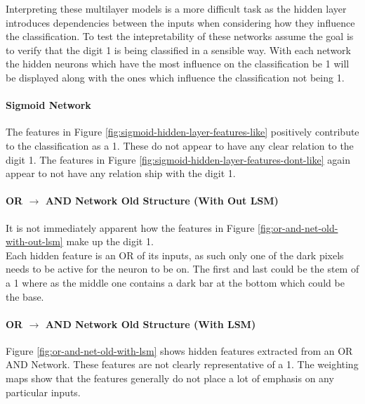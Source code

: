 \begin{minipage}[t]{0.45\textwidth}
	\vspace{0px}
	Interpreting these multilayer models is a more difficult task as the hidden layer introduces dependencies between the inputs when considering how they influence the classification. To test the intepretability of these networks assume the goal is to verify that the digit 1 is being classified in a sensible way. With each network the hidden neurons which have the most influence on the classification be 1 will be displayed along with the ones which influence the classification not being 1.	

	\paragraph{Sigmoid Network}
	The features in Figure \ref{fig:sigmoid-hidden-layer-features-like} positively contribute to the classification as a 1. These do not appear to have any clear relation to the digit 1. The features in Figure \ref{fig:sigmoid-hidden-layer-features-dont-like} again appear to not have any relation ship with the digit 1.
	
	\paragraph{OR $\rightarrow$ AND Network Old Structure (With Out LSM)}
	It is not immediately apparent how the features in Figure \ref{fig:or-and-net-old-with-out-lsm} make up the digit 1. \\
	
	Each hidden feature is an OR of its inputs, as such only one of the dark pixels needs to be active for the neuron to be on. The first and last could be the stem of a 1 where as the middle one contains a dark bar at the bottom which could be the base.

	\paragraph{OR $\rightarrow$ AND Network Old Structure (With LSM)}
	Figure \ref{fig:or-and-net-old-with-lsm} shows hidden features extracted from an OR AND Network. These features are not clearly representative of a 1. The weighting maps show that the features generally do not place a lot of emphasis on any particular inputs.

\end{minipage}
\hspace{0.1\textwidth}
